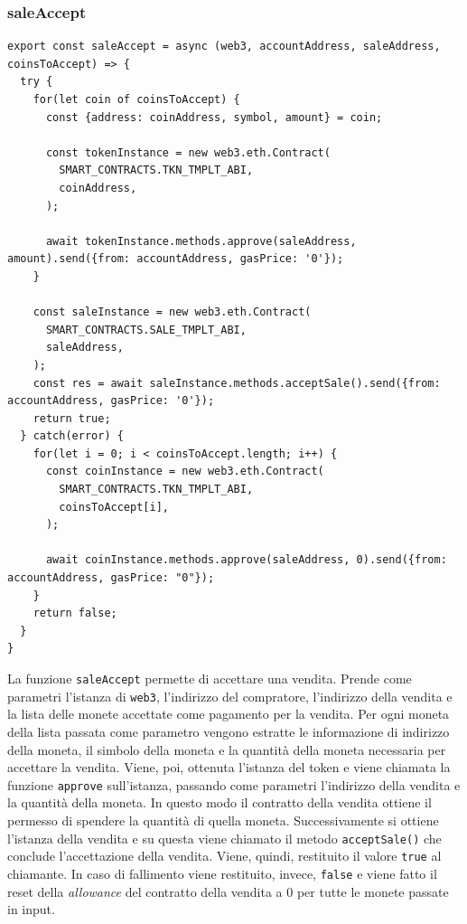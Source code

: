 \documentclass[a4paper]{article}
\begin{document}
        \subsubsection{saleAccept}
        \begin{lstlisting}[style=ES6, title={Funzione saleAccept}]
export const saleAccept = async (web3, accountAddress, saleAddress, coinsToAccept) => {
  try {
    for(let coin of coinsToAccept) {
      const {address: coinAddress, symbol, amount} = coin;

      const tokenInstance = new web3.eth.Contract(
        SMART_CONTRACTS.TKN_TMPLT_ABI,
        coinAddress,
      );

      await tokenInstance.methods.approve(saleAddress, amount).send({from: accountAddress, gasPrice: '0'});
    }

    const saleInstance = new web3.eth.Contract(
      SMART_CONTRACTS.SALE_TMPLT_ABI,
      saleAddress,
    );
    const res = await saleInstance.methods.acceptSale().send({from: accountAddress, gasPrice: '0'});
    return true;
  } catch(error) {
    for(let i = 0; i < coinsToAccept.length; i++) {
      const coinInstance = new web3.eth.Contract(
        SMART_CONTRACTS.TKN_TMPLT_ABI,
        coinsToAccept[i],
      );

      await coinInstance.methods.approve(saleAddress, 0).send({from: accountAddress, gasPrice: "0"});
    }
    return false;
  }
}\end{lstlisting}
        La funzione \verb|saleAccept| permette di accettare una vendita. Prende come parametri l'istanza di \verb|web3|, l'indirizzo del compratore, l'indirizzo della vendita e la lista delle monete accettate come pagamento per la vendita.
        \newline
        Per ogni moneta della lista passata come parametro vengono estratte le informazione di indirizzo della moneta, il simbolo della moneta e la quantità della moneta necessaria per accettare la vendita.
        Viene, poi, ottenuta l'istanza del token e viene chiamata la funzione \verb|approve| sull'istanza, passando come parametri l'indirizzo della vendita e la quantità della moneta. In questo modo il contratto della vendita ottiene il permesso
        di spendere la quantità di quella moneta.
        \newline
        Successivamente si ottiene l'istanza della vendita e su questa viene chiamato il metodo \verb|acceptSale()| che conclude l'accettazione della vendita. Viene, quindi, restituito il valore \verb|true| al chiamante.
        In caso di fallimento viene restituito, invece, \verb|false| e viene fatto il reset della \emph{allowance} del contratto della vendita a 0 per tutte le monete passate in input.
\end{document}
